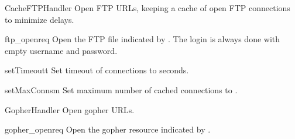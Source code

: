 \begin{classdesc}{CacheFTPHandler}{}
Open FTP URLs, keeping a cache of open FTP connections to minimize
delays.
\end{classdesc}

\begin{methoddesc}[CacheFTPHandler]{ftp_open}{req}
Open the FTP file indicated by .
The login is always done with empty username and password.
\end{methoddesc}

\begin{methoddesc}[CacheFTPHandler]{setTimeout}{t}
Set timeout of connections to  seconds.
\end{methoddesc}

\begin{methoddesc}[CacheFTPHandler]{setMaxConns}{m}
Set maximum number of cached connections to .
\end{methoddesc}

\begin{classdesc}{GopherHandler}{}
Open gopher URLs.
\end{classdesc}

\begin{methoddesc}[GopherHandler]{gopher_open}{req}
Open the gopher resource indicated by .
\end{methoddesc}
